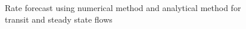 \documentclass[12pt,letterpaper,titlepage]{article}
\begin{document}
\begin{figure}[p]
\caption{\label{fig:rate}Rate forecast using numerical method and analytical method for transit and steady state flows}
\end{figure}
\end{document}
